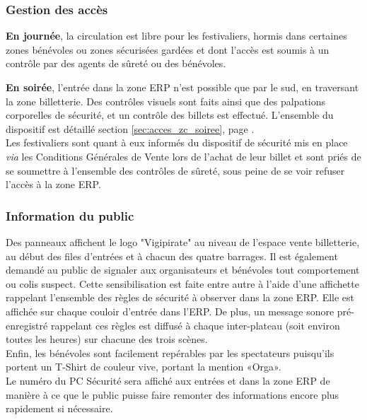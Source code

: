 \documentclass[hidelinks, paper=a4, fontsize=13pt]{report}
\begin{document}
\subsubsection{Gestion des accès} 
\begin{list}{•}{}
	\item \textbf{En journée}, la circulation est libre pour les festivaliers, hormis dans certaines zones bénévoles ou zones sécurisées gardées et dont l'accès est soumis à un contrôle par des agents de sûreté ou des bénévoles.\\
	\item \textbf{En soirée}, l'entrée dans la zone ERP n'est possible que par le sud, en traversant la zone billetterie. Des contrôles visuels sont faits ainsi que des palpations corporelles de sécurité, et un contrôle des billets est effectué. L'ensemble du dispositif est détaillé section \ref{sec:acces_zc_soiree}, page \pageref{sec:acces_zc_soiree}.\\
Les festivaliers sont quant à eux informés du dispositif de sécurité mis en place \textit{via} les Conditions Générales de Vente lors de l'achat de leur billet et sont priés de se soumettre à l'ensemble des contrôles de sûreté, sous peine de se voir refuser l'accès à la zone ERP.
\end{list}

\subsubsection{Information du public}
Des panneaux affichent le logo "Vigipirate" au niveau de l'espace vente billetterie, au début des files d'entrées et à chacun des quatre barrages. Il est également demandé au public de signaler aux organisateurs et bénévoles tout comportement ou colis suspect. Cette sensibilisation est faite entre autre à l'aide d'une affichette rappelant l’ensemble des règles de sécurité à observer dans la zone ERP. Elle est affichée sur chaque couloir d’entrée dans l’ERP. De plus, un message sonore pré-enregistré rappelant ces règles est diffusé à chaque inter-plateau (soit environ toutes les heures) sur chacune des trois scènes.\\

Enfin, les bénévoles sont facilement repérables par les spectateurs puisqu’ils portent un T-Shirt de couleur vive, portant la mention «Orga». \\
Le numéro du PC Sécurité sera affiché aux entrées et dans la zone ERP de manière à ce que le public puisse faire remonter des informations encore plus rapidement si nécessaire. \\
\end{document}
